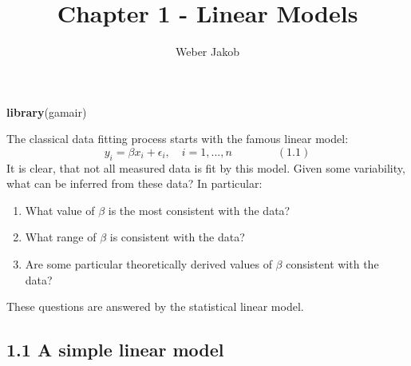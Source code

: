 \documentclass[
]{article}
\title{Chapter 1 - Linear Models}
\author{Weber Jakob}
\date{}
\newenvironment{Shaded}{\begin{snugshade}}{\end{snugshade}}
\newcommand{\KeywordTok}[1]{\textcolor[rgb]{0.13,0.29,0.53}{\textbf{#1}}}
\newcommand{\NormalTok}[1]{#1}
\providecommand{\tightlist}{%
  \setlength{\itemsep}{0pt}\setlength{\parskip}{0pt}}
\begin{document}
\maketitle

\begin{Shaded}
\begin{Highlighting}[]
\KeywordTok{library}\NormalTok{(gamair)}
\end{Highlighting}
\end{Shaded}

The classical data fitting process starts with the famous linear model:
\begin{equation}
  \label{eq:1}
   y_i = \beta x_i + \epsilon_i, \quad i=1, ..., n \qquad \qquad (1.1)
\end{equation} It is clear, that not all measured data is fit by this
model. Given some variability, what can be inferred from these data? In
particular:

\begin{enumerate}
\def\labelenumi{\arabic{enumi}.}
\tightlist
\item
  What value of \(\beta\) is the most consistent with the data?
\item
  What range of \(\beta\) is consistent with the data?
\item
  Are some particular theoretically derived values of \(\beta\)
  consistent with the data?
\end{enumerate}

These questions are answered by the statistical linear model.

\hypertarget{a-simple-linear-model}{%
\subsection{1.1 A simple linear model}\label{a-simple-linear-model}}
\end{document}
